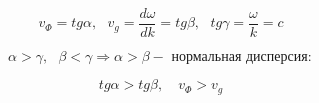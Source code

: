 \documentclass[12pt, a4paper]{report}
\begin{document}
\[ v_{\Phi } = tg \alpha, \text{ }  v_g = \frac{d \omega } {dk } = tg \beta , \text{ }  tg \gamma = \frac{\omega}{k }  = c   \] 

\[ \alpha > \gamma , \text{ }  \beta < \gamma \Rightarrow \alpha  > \beta - \text{ нормальная дисперсия}  :  \] 

\[ tg \alpha > tg \beta ,\quad v_{\Phi }> v_g  \] 






\ifdefined\mainfile
\else
    
\end{document}
